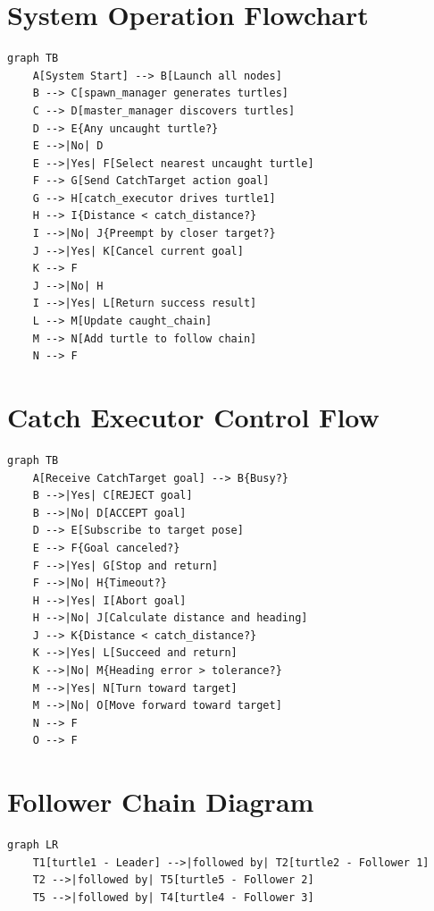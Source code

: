 \section{System Operation Flowchart}

\begin{lstlisting}[language={},title={System Operation Flow}]
graph TB
    A[System Start] --> B[Launch all nodes]
    B --> C[spawn_manager generates turtles]
    C --> D[master_manager discovers turtles]
    D --> E{Any uncaught turtle?}
    E -->|No| D
    E -->|Yes| F[Select nearest uncaught turtle]
    F --> G[Send CatchTarget action goal]
    G --> H[catch_executor drives turtle1]
    H --> I{Distance < catch_distance?}
    I -->|No| J{Preempt by closer target?}
    J -->|Yes| K[Cancel current goal]
    K --> F
    J -->|No| H
    I -->|Yes| L[Return success result]
    L --> M[Update caught_chain]
    M --> N[Add turtle to follow chain]
    N --> F
\end{lstlisting}

\section{Catch Executor Control Flow}

\begin{lstlisting}[language={},title={Catch Executor Control Flow}]
graph TB
    A[Receive CatchTarget goal] --> B{Busy?}
    B -->|Yes| C[REJECT goal]
    B -->|No| D[ACCEPT goal]
    D --> E[Subscribe to target pose]
    E --> F{Goal canceled?}
    F -->|Yes| G[Stop and return]
    F -->|No| H{Timeout?}
    H -->|Yes| I[Abort goal]
    H -->|No| J[Calculate distance and heading]
    J --> K{Distance < catch_distance?}
    K -->|Yes| L[Succeed and return]
    K -->|No| M{Heading error > tolerance?}
    M -->|Yes| N[Turn toward target]
    M -->|No| O[Move forward toward target]
    N --> F
    O --> F
\end{lstlisting}

\section{Follower Chain Diagram}

\begin{lstlisting}[language={},title={Follower Chain}]
graph LR
    T1[turtle1 - Leader] -->|followed by| T2[turtle2 - Follower 1]
    T2 -->|followed by| T5[turtle5 - Follower 2]
    T5 -->|followed by| T4[turtle4 - Follower 3]
\end{lstlisting}
